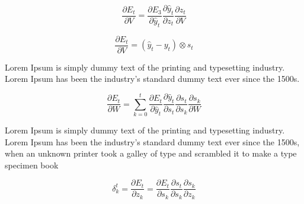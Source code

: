 \begin{equation}
\frac{\partial E_{t}}{\partial V} = \frac{\partial E_{3}}{\partial \hat{y}_{t}}\frac{\partial \hat{y}_{t}}{\partial z_{t}}\frac{\partial z_{t}}{\partial V}
\label{eq:mod_softmax}
\end{equation}

\begin{equation}
    \frac{\partial E_{t}}{\partial V} = (\hat{y}_{t} - y_{t}) \otimes s_{t}
\label{eq:partial_v}
\end{equation}

Lorem Ipsum is simply dummy text of the printing and typesetting industry. Lorem Ipsum has been the industry's standard dummy text ever since the 1500s.

\begin{equation}
\frac{\partial E_{t}}{\partial W} = \sum^{t}_{k=0}\frac{\partial E_{t}}{\partial \hat{y}_{t}}\frac{\partial \hat{y}_{t}}{\partial s_{t}}\frac{\partial s_{t}}{\partial s_{k}}\frac{\partial s_{k}}{\partial W}
\label{eq:rule_chain}
\end{equation}

Lorem Ipsum is simply dummy text of the printing and typesetting industry. Lorem Ipsum has been the industry's standard dummy text ever since the 1500s, when an unknown printer took a galley of type and scrambled it to make a type specimen book

\begin{equation}
\delta^{t}_{k} = \frac{\partial E_{t} }{\partial z_{k}} = \frac{\partial E_{t} }{\partial s_{k}}\frac{\partial s_{t} }{\partial s_{k}}\frac{\partial s_{k} }{\partial z_{k}}
\label{eq:deltarnn}
\end{equation}


